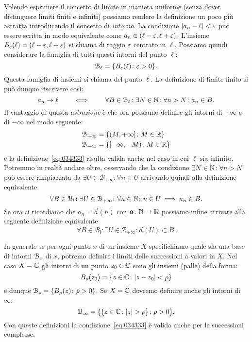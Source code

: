 Volendo esprimere il concetto di limite in maniera uniforme
(senza dover distinguere limiti finiti e infiniti) possiamo
rendere la definizione un poco più astratta introducendo il concetto
di \emph{intorno}.
La condizione ${\left|a_n - \ell\right|}< \varepsilon$ può essere scritta in
modo equivalente come
$a_n \in (\ell-\varepsilon, \ell+\varepsilon)$. L'insieme $B_\varepsilon(\ell) = (\ell-\varepsilon, \ell+\varepsilon)$
si chiama  di raggio $\varepsilon$ centrato in $\ell$.
Possiamo quindi considerare la famiglia
di tutti questi intorni del punto $\ell$:
\[
 \mathcal B_\ell = {\left\{ B_\varepsilon(\ell)\colon \varepsilon>0  \right\}}.
\]
Questa famiglia di insiemi si chiama  del punto $\ell$.
La definizione
di limite finito si può dunque riscrivere così:
\begin{equation}\label{eq:034333}
  a_n\to \ell
  \qquad \iff \qquad
  \forall B \in \mathcal B_\ell\colon \exists N\in \mathbb N\colon \forall n>N\colon a_n\in B.
\end{equation}
Il vantaggio di questa \emph{astrazione} è che ora possiamo definire
gli intorni di $+\infty$ e di $-\infty$ nel modo seguente:
\begin{align*}
  \mathcal B_{+\infty} &= {\left\{  (M,+\infty]\colon M\in \mathbb R \right\}}\\
  \mathcal B_{-\infty} &= {\left\{  [-\infty, -M)\colon M \in \mathbb R \right\}}
\end{align*}
e la definizione~\eqref{eq:034333} risulta valida anche nel
caso in cui $\ell$ sia infinito.
Potremmo in realtà andare oltre, osservando che la condizione
$\exists N\in \mathbb N \colon \forall n>N$ può essere rimpiazzata
da $\exists U\in \mathcal B_{+\infty}\colon \forall n\in U$
arrivando quindi alla definizione equivalente \
\[
\forall B\in \mathcal B_l\colon \exists U\in \mathcal B_{+\infty}\colon
\forall n\in \mathbb N \colon n\in U \implies a_n\in B.
\]
Se ora ci ricordiamo che $a_n = \vec a(n)$ con $\boldsymbol a\colon \mathbb N \to \mathbb R$
possiamo infine arrivare alla seguente definizione equivalente
\[
\forall B\in \mathcal B_l\colon \exists U\in \mathcal B_{+\infty}\colon
\vec a(U)\subset B.
\]

In generale se per ogni punto $x$ di un insieme $X$ specifichiamo quale
sia una base di intorni $\mathcal B_x$ di $x$, potremo definire i limiti delle successioni
a valori in $X$.
Nel caso $X=\mathbb C$ gli intorni di un punto $z_0\in \mathbb C$ sono gli insiemi
(palle) della forma:
\[
  B_\rho(z_0) = {\left\{ z\in \mathbb C \colon {\left|z-z_0\right|}<\rho \right\}}
\]
e dunque $\mathcal B_{z} = {\left\{ B_\rho(z)\colon \rho>0 \right\}}$. Se $X=\bar {\mathbb C}$ dovremo
definire anche gli intorni di $\infty$:
\[
  \mathcal B_\infty = {\left\{  {\left\{ z\in \mathbb C\colon {\left|z\right|}>\rho \right\}} \colon \rho>0 \right\}}.
\]
Con queste definizioni la condizione~\eqref{eq:034333} è valida
anche per le successioni complesse.

